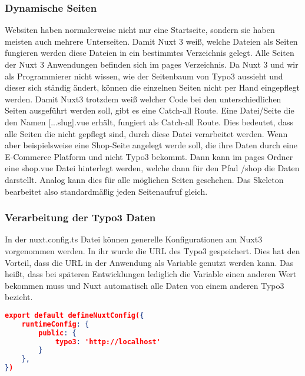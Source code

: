\subsubsection{Dynamische Seiten}
\label{sec:Dynamische Seiten}
Websiten haben normalerweise nicht nur eine Startseite, sondern sie haben meisten auch mehrere Unterseiten. Damit Nuxt 3 weiß, welche Dateien als Seiten fungieren werden diese Dateien in ein bestimmtes Verzeichnis gelegt. Alle Seiten der Nuxt 3 Anwendungen befinden sich im pages Verzeichnis. Da Nuxt 3 und wir als Programmierer nicht wissen, wie der Seitenbaum von Typo3 aussieht und dieser sich ständig ändert, können die einzelnen Seiten nicht per Hand eingepflegt werden. Damit Nuxt3 trotzdem weiß welcher Code bei den unterschiedlichen Seiten ausgeführt werden soll, gibt es eine Catch-all Route. Eine Datei/Seite die den Namen [...slug].vue erhält, fungiert als Catch-all Route. Dies bedeutet, dass alle Seiten die nicht gepflegt sind, durch diese Datei verarbeitet werden. Wenn aber beispielsweise eine Shop-Seite angelegt werde soll, die ihre Daten durch eine E-Commerce Platform und nicht Typo3 bekommt. Dann kann im pages Ordner eine shop.vue Datei hinterlegt werden, welche dann für den Pfad /shop die Daten darstellt. Analog kann dies für alle möglichen Seiten geschehen. Das Skeleton bearbeitet also standardmäßig jeden Seitenaufruf gleich.

\subsubsection{Verarbeitung der Typo3 Daten}
\label{sec:Verarbeitung der Typo3 Daten}

In der nuxt.config.ts Datei können generelle Konfigurationen am Nuxt3 vorgenommen werden. In ihr wurde die URL des Typo3 gespeichert. Dies hat den Vorteil, dass die URL in der Anwendung als Variable genutzt werden kann. Das heißt, dass bei späteren Entwicklungen lediglich die Variable einen anderen Wert bekommen muss und Nuxt automatisch alle Daten von einem anderen Typo3 bezieht.

\begin{lstlisting}[language=json,firstnumber=1]
export default defineNuxtConfig({
    runtimeConfig: {
        public: {
            typo3: 'http://localhost'
        }
    },
})
\end{lstlisting}

